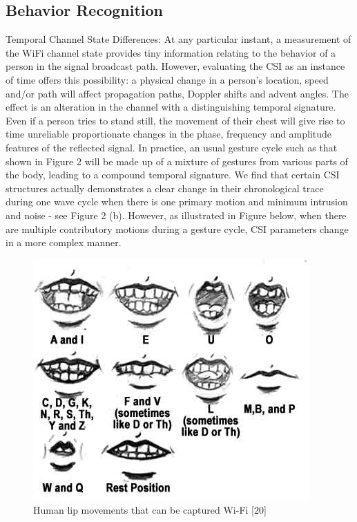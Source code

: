 \documentclass[conference]{IEEEtran}
\begin{document}
\subsection{Behavior Recognition}
Temporal Channel State Differences: At any particular instant, a measurement of the WiFi channel state provides tiny information relating to the behavior of a person in the signal broadcast path. However, evaluating the CSI as an instance of time offers this possibility: a physical change in a person’s location, speed and/or path will affect propagation paths, Doppler shifts and advent angles. The effect is an alteration in the channel with a distinguishing temporal signature. Even if a person tries to stand still, the movement of their chest will give rise to time unreliable proportionate changes in the phase, frequency and amplitude features of the reflected signal. In practice, an usual gesture cycle such as that shown in Figure 2 will be made up of a mixture of gestures from various parts of the body, leading to a compound temporal signature. We find that certain CSI structures actually demonstrates a clear change in their chronological trace during one wave cycle when there is one primary motion and minimum intrusion and noise - see Figure 2 (b). However, as illustrated in Figure below, when there are multiple contributory motions during a gesture cycle, CSI parameters change in a more complex manner. 

\begin{figure}[h!]
    \includegraphics[scale=0.40]{fig13.png}
    \caption{Human lip movements that can be captured Wi-Fi [20]}
    \label{fig:me}
\end{figure}
\end{document}
